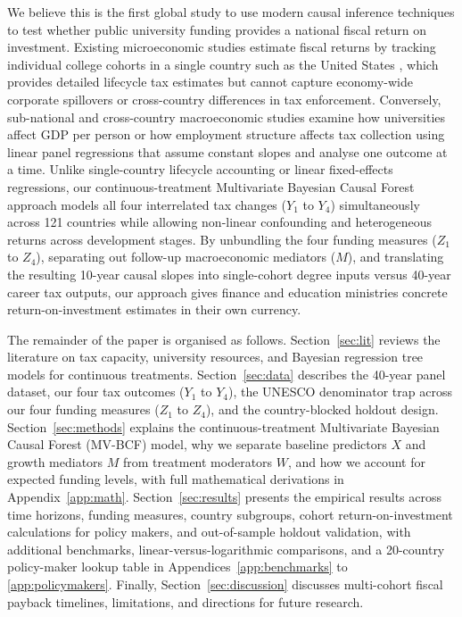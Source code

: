 \documentclass[11pt,a4paper]{article}
\begin{document}
We believe this is the first global study to use modern causal inference techniques to test whether public university funding provides a national fiscal return on investment. Existing microeconomic studies estimate fiscal returns by tracking individual college cohorts in a single country such as the United States \citep{trostel2010fiscal, chakrabarti2020state, hendren2020unified}, which provides detailed lifecycle tax estimates but cannot capture economy-wide corporate spillovers or cross-country differences in tax enforcement. Conversely, sub-national and cross-country macroeconomic studies examine how universities affect GDP per person \citep{valero2019economic} or how employment structure affects tax collection \citep{besley2014pillars, jensen2022employment} using linear panel regressions that assume constant slopes and analyse one outcome at a time. Unlike single-country lifecycle accounting or linear fixed-effects regressions, our continuous-treatment Multivariate Bayesian Causal Forest approach models all four interrelated tax changes ($Y_1$ to $Y_4$) simultaneously across 121 countries while allowing non-linear confounding and heterogeneous returns across development stages. By unbundling the four funding measures ($Z_1$ to $Z_4$), separating out follow-up macroeconomic mediators ($M$), and translating the resulting 10-year causal slopes into single-cohort degree inputs versus 40-year career tax outputs, our approach gives finance and education ministries concrete return-on-investment estimates in their own currency.

The remainder of the paper is organised as follows. Section~\ref{sec:lit} reviews the literature on tax capacity, university resources, and Bayesian regression tree models for continuous treatments. Section~\ref{sec:data} describes the 40-year panel dataset, our four tax outcomes ($Y_1$ to $Y_4$), the UNESCO denominator trap across our four funding measures ($Z_1$ to $Z_4$), and the country-blocked holdout design. Section~\ref{sec:methods} explains the continuous-treatment Multivariate Bayesian Causal Forest (MV-BCF) model, why we separate baseline predictors $X$ and growth mediators $M$ from treatment moderators $W$, and how we account for expected funding levels, with full mathematical derivations in Appendix~\ref{app:math}. Section~\ref{sec:results} presents the empirical results across time horizons, funding measures, country subgroups, cohort return-on-investment calculations for policy makers, and out-of-sample holdout validation, with additional benchmarks, linear-versus-logarithmic comparisons, and a 20-country policy-maker lookup table in Appendices~\ref{app:benchmarks} to \ref{app:policymakers}. Finally, Section~\ref{sec:discussion} discusses multi-cohort fiscal payback timelines, limitations, and directions for future research.
\end{document}
